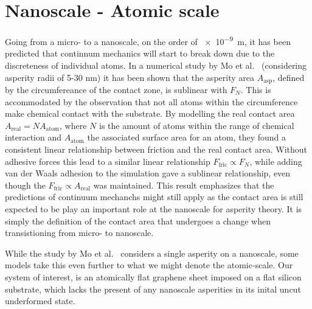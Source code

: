 \section{Nanoscale - Atomic scale}
Going from a micro- to a nanoscale, on the order of \SI{e-9}{m}, it has been
predicted that continnum mechanics will start to break down \cite{luan_breakdown_2005} due to the discreteness of individual atoms. In a numerical study by Mo et
al.\ \cite{mo_friction_2009} (considering asperity radii of 5-30 nm) it has been
shown that the asperity area $A_{\text{asp}}$, defined by the circumfereance of
the contact zone, is sublinear with $F_N$. This is accommodated by the
observation that not all atoms within the circumference make chemical contact
with the substrate. By modelling the real contact area $A_{\text{real}} =
NA_{\text{atom}}$, where $N$ is the amount of atoms within the range of chemical
interaction and $A_{\text{atom}}$ the associated surface area for an atom, they
found a consistent linear relationship between friction and the real contact
area. Without adhesive forces this lead to a similar linear relationship
$F_{\text{fric}} \propto F_N$, while adding van der Waals adhesion to the
simulation gave a sublinear relationship, even though the $F_{\text{fric}}
\propto A_{\text{real}}$ was maintained. This result emphasizes that the predictions of continuum mechanchs might still apply as the contact
area is still expected to be play an important role at the nanoscale for
asperity theory. It is simply the definition of the contact area that undergoes
a change when transistioning from micro- to nanoscale. 

While the study by Mo et al.\ \cite{mo_friction_2009} considers a single
asperity on a nanoscale, some models take this even further to what we might denote the atomic-scale. Our system of interest, is an atomically flat graphene sheet imposed on a flat silicon substrate, which lacks the present of any nanoscale asperities in its inital uncut underformed state.





